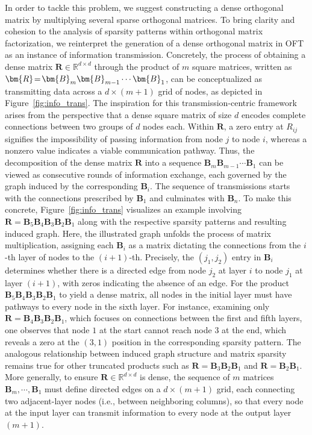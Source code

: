 In order to tackle this problem, we suggest constructing a dense orthogonal matrix by multiplying several sparse orthogonal matrices. To bring clarity and cohesion to the analysis of sparsity patterns within orthogonal matrix factorization, we reinterpret the generation of a dense orthogonal matrix in OFT as an instance of information transmission. Concretely, the process of obtaining a dense matrix $\bm{R}\in\mathbb{R}^{d\times d}$ through the product of $m$ square matrices, written as $\thickmuskip=2mu \medmuskip=2mu \bm{R}=\bm{B}_m\bm{B}_{m-1}\cdots\bm{B}_1$, can be conceptualized as transmitting data across a $d\times (m+1)$ grid of nodes, as depicted in Figure~\ref{fig:info_trans}. The inspiration for this transmission-centric framework arises from the perspective that a dense square matrix of size $d$ encodes complete connections between two groups of $d$ nodes each. Within $\bm{R}$, a zero entry at $R_{ij}$ signifies the impossibility of passing information from node $j$ to node $i$, whereas a nonzero value indicates a viable communication pathway. Thus, the decomposition of the dense matrix $\bm{R}$ into a sequence $\bm{B}_m\bm{B}_{m-1}\cdots\bm{B}_1$ can be viewed as consecutive rounds of information exchange, each governed by the graph induced by the corresponding $\bm{B}_i$. The sequence of transmissions starts with the connections prescribed by $\bm{B}_1$ and culminates with $\bm{B}_n$. To make this concrete, Figure~\ref{fig:info_trans} visualizes an example involving $\bm{R}=\bm{B}_5\bm{B}_4\bm{B}_3\bm{B}_2\bm{B}_1$ along with the respective sparsity patterns and resulting induced graph. Here, the illustrated graph unfolds the process of matrix multiplication, assigning each $\bm{B}_i$ as a matrix dictating the connections from the $i$-th layer of nodes to the $(i+1)$-th. Precisely, the $(j_1,j_2)$ entry in $\bm{B}_i$ determines whether there is a directed edge from node $j_2$ at layer $i$ to node $j_1$ at layer $(i+1)$, with zeros indicating the absence of an edge. For the product $\bm{B}_5\bm{B}_4\bm{B}_3\bm{B}_2\bm{B}_1$ to yield a dense matrix, all nodes in the initial layer must have pathways to every node in the sixth layer. For instance, examining only $\bm{R}=\bm{B}_4\bm{B}_3\bm{B}_2\bm{B}_1$, which focuses on connections between the first and fifth layers, one observes that node $1$ at the start cannot reach node $3$ at the end, which reveals a zero at the $(3,1)$ position in the corresponding sparsity pattern. The analogous relationship between induced graph structure and matrix sparsity remains true for other truncated products such as $\bm{R}=\bm{B}_3\bm{B}_2\bm{B}_1$ and $\bm{R}=\bm{B}_2\bm{B}_1$. More generally, to ensure $\bm{R}\in\mathbb{R}^{d\times d}$ is dense, the sequence of $m$ matrices $\bm{B}_m,\cdots,\bm{B}_1$ must define directed edges on a $d\times (m+1)$ grid, each connecting two adjacent-layer nodes (i.e., between neighboring columns), so that every node at the input layer can transmit information to every node at the output layer $(m+1)$.

